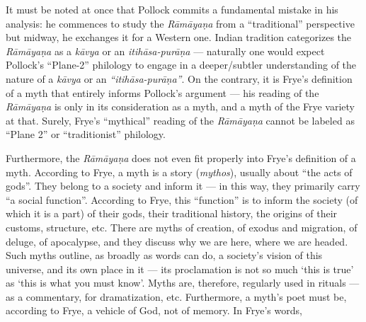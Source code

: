 It must be noted at once that Pollock commits a fundamental mistake in his analysis: he commences to study the {\sl Rāmāyaṇa} from a “traditional” perspective but midway, he exchanges it for a Western one.  Indian tradition categorizes the {\sl Rāmāyaṇa} as a {\sl kāvya} or an {\sl itihāsa-purāṇa} --- naturally one would expect Pollock’s “Plane-2” philology to engage in a deeper/subtler understanding of the nature of a {\sl kāvya} or an {\sl “itihāsa-purāṇa”}. On the contrary, it is Frye’s definition of a myth that entirely informs Pollock’s argument --- his reading of the {\sl Rāmāyaṇa} is only in its consideration as a myth, and a myth of the Frye variety at that. Surely, Frye’s “mythical” reading of the {\sl Rāmāyaṇa} cannot be labeled as “Plane 2” or “traditionist” philology.

Furthermore, the {\sl Rāmāyaṇa} does not even fit properly into Frye’s definition of a myth. According to Frye, a myth is a story ({\sl mythos}), usually about “the acts of gods”. They belong to a society and inform it --- in this way, they primarily carry “a social function”. According to Frye, this “function” is to inform the society (of which it is a part) of their gods, their traditional history, the origins of their customs, structure, etc. There are myths of creation, of exodus and migration, of deluge, of apocalypse, and they discuss why we are here, where we are headed. Such myths outline, as broadly as words can do, a society’s vision of this universe, and its own place in it --- its proclamation is not so much ‘this is true’ as ‘this is what you must know’. Myths are, therefore, regularly used in rituals --- as a commentary, for dramatization, etc. Furthermore, a myth’s poet must be, according to Frye, a vehicle of God, not of memory. In Frye’s words, 

